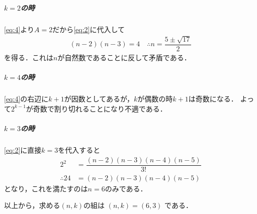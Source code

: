 \documentclass[../../main.tex]{subfiles}
\begin{document}
\subparagraph{$k=2$の時}

\cref{eq:4}より$A=2$だから\cref{eq:2}に代入して
\begin{align}
  (n-2)(n-3) = 4
  \quad\therefore
  n = \dfrac{5\pm\sqrt{17}}{2}
\end{align}
を得る．これは$n$が自然数であることに反して矛盾である．

\subparagraph{$k=4$の時}

\cref{eq:4}の右辺に$k+1$が因数としてあるが，$k$が偶数の時$k+1$は奇数になる．
よって$2^{k-1}$が奇数で割り切れることになり不適である．

\subparagraph{$k=3$の時}

\cref{eq:2}に直接$k=3$を代入すると
\begin{align}
  2^2 &= \dfrac{(n-2)(n-3)(n-4)(n-5)}{3!} \\
  \therefore
  24  &= (n-2)(n-3)(n-4)(n-5)
\end{align}
となり，これを満たすのは$n=6$のみである．
\casesend

以上から，求める$(n,k)$の組は $(n, k) = (6, 3)$ である．
\end{document}
